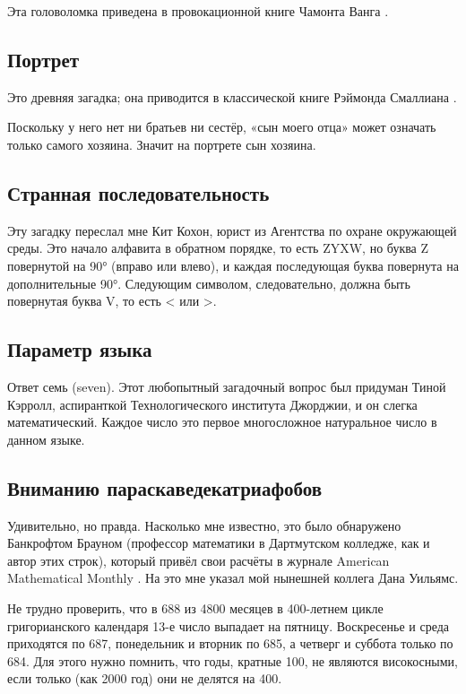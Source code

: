 Эта головоломка приведена в провокационной книге Чамонта Ванга \cite{wang}.

\subsection*{Портрет}

Это древняя загадка;
она приводится в классической книге Рэймонда Смаллиана \cite{smullyan}.

Поскольку у него нет ни братьев ни сестёр, «сын моего отца» может означать только самого хозяина.
Значит на портрете сын хозяина.

\subsection*{Странная последовательность}

Эту загадку переслал мне Кит Кохон, юрист из Агентства по охране окружающей среды.
Это начало алфавита в обратном порядке, то есть ZYXW, но буква Z повернутой на 90° (вправо или влево), и каждая последующая буква повернута на дополнительные 90°.
Следующим символом, следовательно, должна быть повернутая буква V, то есть < или >.

\subsection*{Параметр языка}

Ответ семь (seven).
Этот любопытный загадочный вопрос был придуман Тиной Кэрролл, аспиранткой Технологического института Джорджии,
и он слегка математический. 
Каждое число это первое многосложное натуральное число в данном языке.

\subsection*{Вниманию параскаведекатриафобов}

Удивительно, но правда.
Насколько мне известно, это было обнаружено Банкрофтом Брауном (профессор математики в Дартмутском колледже, как и автор этих строк), который привёл свои расчёты в журнале American Mathematical Monthly \cite{brown}.
На это мне указал мой нынешней коллега Дана Уильямс.

Не трудно проверить, что в 688 из 4800 месяцев в 400-летнем цикле григорианского календаря 13-е число выпадает на пятницу.
Воскресенье и среда приходятся по 687, понедельник и вторник по 685, а четверг и суббота только по 684.
Для этого нужно помнить, что годы, кратные 100, не являются високосными, если только (как 2000 год) они не делятся на 400.

